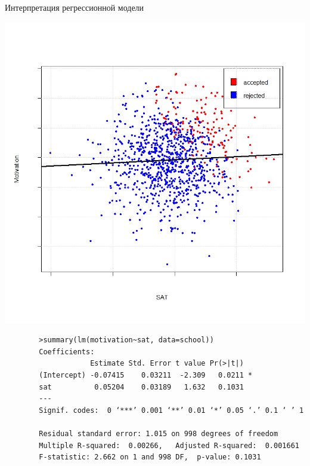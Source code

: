 \documentclass[9pt,pdf,utf8,hyperref={unicode},aspectratio=169]{beamer}
\begin{document}
\begin{frame}[fragile]{Интерпретация регрессионной модели}	
		\begin{center}
			\includegraphics[height=0.5\textheight]{causality1.png}
		\end{center}	
    {\footnotesize
    	\begin{verbatim}
		>summary(lm(motivation~sat, data=school))
		Coefficients:
		            Estimate Std. Error t value Pr(>|t|)  
		(Intercept) -0.07415    0.03211  -2.309   0.0211 *
		sat          0.05204    0.03189   1.632   0.1031  
		---
		Signif. codes:  0 ‘***’ 0.001 ‘**’ 0.01 ‘*’ 0.05 ‘.’ 0.1 ‘ ’ 1
		
		Residual standard error: 1.015 on 998 degrees of freedom
		Multiple R-squared:  0.00266,	Adjusted R-squared:  0.001661 
		F-statistic: 2.662 on 1 and 998 DF,  p-value: 0.1031
    	\end{verbatim}		
	}		
\end{frame}
\end{document}
